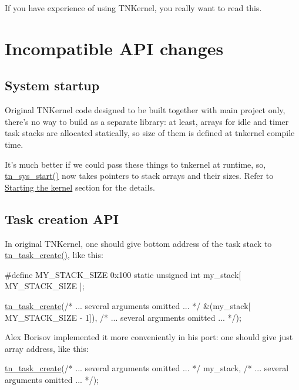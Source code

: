 If you have experience of using T\+N\+Kernel, you really want to read this.\hypertarget{tnkernel_diff_tnkernel_diff_api}{}\section{Incompatible A\+P\+I changes}\label{tnkernel_diff_tnkernel_diff_api}
\hypertarget{tnkernel_diff_tnkernel_diff_api_sys_start}{}\subsection{System startup}\label{tnkernel_diff_tnkernel_diff_api_sys_start}
Original T\+N\+Kernel code designed to be built together with main project only, there's no way to build as a separate library\+: at least, arrays for idle and timer task stacks are allocated statically, so size of them is defined at tnkernel compile time.

It's much better if we could pass these things to tnkernel at runtime, so, {\ttfamily \hyperlink{tn__sys_8h_a62ab25d9d8ca01c02d368968f19e49bf}{tn\+\_\+sys\+\_\+start()}} now takes pointers to stack arrays and their sizes. Refer to \hyperlink{quick_guide_starting_the_kernel}{Starting the kernel} section for the details.\hypertarget{tnkernel_diff_tnkernel_diff_task_create}{}\subsection{Task creation A\+P\+I}\label{tnkernel_diff_tnkernel_diff_task_create}
In original T\+N\+Kernel, one should give bottom address of the task stack to {\ttfamily \hyperlink{tn__tasks_8h_a548d5adda09d1b4e393b5df0e9e1a7a5}{tn\+\_\+task\+\_\+create()}}, like this\+:


\begin{DoxyCode}
\textcolor{preprocessor}{#define MY\_STACK\_SIZE   0x100}
\textcolor{keyword}{static} \textcolor{keywordtype}{unsigned} \textcolor{keywordtype}{int} my\_stack[ MY\_STACK\_SIZE ];

\hyperlink{tn__tasks_8h_a548d5adda09d1b4e393b5df0e9e1a7a5}{tn\_task\_create}(\textcolor{comment}{/* ... several arguments omitted ... */}
               &(my\_stack[ MY\_STACK\_SIZE - 1]),
               \textcolor{comment}{/* ... several arguments omitted ... */});
\end{DoxyCode}


Alex Borisov implemented it more conveniently in his port\+: one should give just array address, like this\+: 
\begin{DoxyCode}
\hyperlink{tn__tasks_8h_a548d5adda09d1b4e393b5df0e9e1a7a5}{tn\_task\_create}(\textcolor{comment}{/* ... several arguments omitted ... */}
               my\_stack,
               \textcolor{comment}{/* ... several arguments omitted ... */});
\end{DoxyCode}


